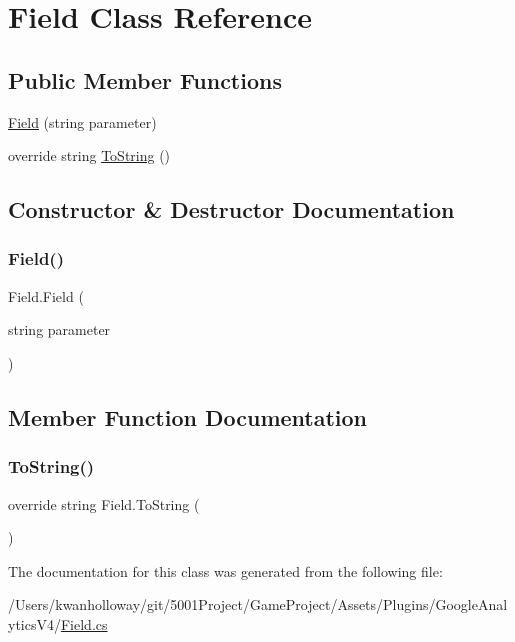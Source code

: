 \hypertarget{class_field}{}\section{Field Class Reference}
\label{class_field}
\subsection*{Public Member Functions}
\begin{DoxyCompactItemize}
\item 
\hyperlink{class_field_a1d2bda8e78e7b69ef61b39bcd80e87c8}{Field} (string parameter)
\item 
override string \hyperlink{class_field_a40bbdd7a59a0b064dfdcfeb08229eeac}{To\+String} ()
\end{DoxyCompactItemize}


\subsection{Constructor \& Destructor Documentation}
\mbox{\label{class_field_a1d2bda8e78e7b69ef61b39bcd80e87c8}} 
\subsubsection{\texorpdfstring{Field()}{Field()}}
{\footnotesize\ttfamily Field.\+Field (\begin{DoxyParamCaption}\item[{string}]{parameter }\end{DoxyParamCaption})}



\subsection{Member Function Documentation}
\mbox{\label{class_field_a40bbdd7a59a0b064dfdcfeb08229eeac}} 
\subsubsection{\texorpdfstring{To\+String()}{ToString()}}
{\footnotesize\ttfamily override string Field.\+To\+String (\begin{DoxyParamCaption}{ }\end{DoxyParamCaption})}



The documentation for this class was generated from the following file\+:\begin{DoxyCompactItemize}
\item 
/\+Users/kwanholloway/git/5001\+Project/\+Game\+Project/\+Assets/\+Plugins/\+Google\+Analytics\+V4/\hyperlink{_field_8cs}{Field.\+cs}\end{DoxyCompactItemize}
